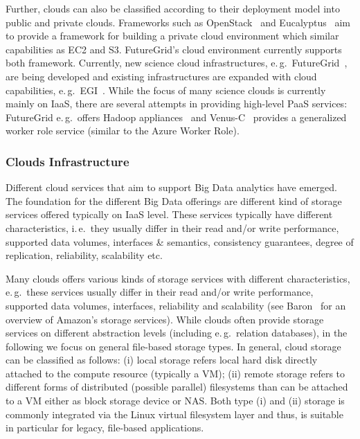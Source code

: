 \documentclass[times]{cpeauth}
\newcommand{\alnote}[1]{ {\textcolor{green} { ***andreL: #1 }}}
\newcommand{\alnote}[1]{}
\begin{document}
Further, clouds can also be classified according to their deployment model
into public and private clouds. Frameworks such as OpenStack~\cite{openstack}
and Eucalyptus~\cite{euca} aim to provide a framework for building a private
cloud environment which similar capabilities as EC2 and S3. FutureGrid's cloud
environment currently supports both framework. Currently, new science cloud
infrastructures, e.\,g.\ FutureGrid~\cite{futuregrid}, are being developed and
existing infrastructures are expanded with cloud capabilities, e.\,g.\
EGI~\cite{egi-cloud}. While the focus of many science clouds is currently
mainly on IaaS, there are several attempts in providing high-level PaaS
services: FutureGrid e.\,g.\ offers Hadoop appliances~\cite{2016793} and
Venus-C~\cite{venusc-generic-worker} provides a generalized worker role
service (similar to the Azure Worker Role).

\subsubsection*{Clouds Infrastructure}

Different cloud services that aim to support Big Data analytics have emerged.
The foundation for the different Big Data offerings are different kind of
storage services offered typically on IaaS level. These services typically
have different characteristics, i.\,e.\ they usually differ in their read
and/or write performance, supported data volumes, interfaces \& semantics,
consistency guarantees, degree of replication, reliability, scalability etc.


Many clouds offers various kinds of storage services with different
characteristics, e.\,g.\ these services usually differ in their read
and/or write performance, supported data volumes, interfaces,
reliability and scalability (see Baron~\cite{baron2010} for an
overview of Amazon's storage services). While clouds often provide
storage services on different abstraction levels (including e.\,g.\
relation databases), in the following we focus on general file-based
storage types. In general, cloud storage can be classified as follows:
(i) local storage refers local hard disk directly attached to the
compute resource (typically a VM); (ii) remote storage refers to
different forms of distributed (possible parallel) filesystems than
can be attached to a VM either as block storage device or NAS. Both
type (i) and (ii) storage is commonly integrated via the Linux virtual
filesystem layer and thus, is suitable in particular for legacy,
file-based applications.
\end{document}

